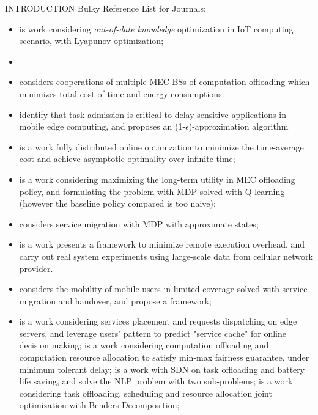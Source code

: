 \documentclass[10pt, conference, letterpaper]{IEEEtran}
\begin{document}
\begin{section}{INTRODUCTION}
        Bulky Reference List for Journals:
        \begin{itemize}
            \item {} \cite{Lyu2017} is work considering \emph{out-of-date knowledge} optimization in IoT computing scenario, with Lyapunov optimization;
            \item {} \cite{Lyu2018b} 
            \item {} \cite{Fan2017} considers cooperations of multiple MEC-BSs of computation offloading which minimizes total cost of time and energy consumptions.
            \item {} \cite{Lyu2018} identify that task admission is critical to delay-sensitive applications in mobile edge computing, and proposes an (1-$\epsilon$)-approximation algorithm
            \item {} \cite{Lyu2018a} is a work fully distributed online optimization to minimize the time-average cost and achieve asymptotic optimality over infinite time;
            \item {} \cite{Zheng2019} is a work considering maximizing the long-term utility in MEC offloading policy, and formulating the problem with MDP solved with Q-learning (however the baseline policy compared is too naive);
            \item {} \cite{Wang2015} considers service migration with MDP with approximate states;
            
            \item {} \cite{Yu2018} is a work presents a framework to minimize remote execution overhead, and carry out real system experiments using large-scale data from cellular network provider.
            \item {} \cite{Wang2018} considers the mobility of mobile users in limited coverage solved with service migration and handover, and propose a framework;
            
            \item {}
                \cite{Yang2016} is a work considering services placement and requests dispatching on edge servers, and leverage users' pattern to predict "service cache" for online decision making;
                \cite{Du2018} is a work considering computation offloading and computation resource allocation to satisfy min-max fairness guarantee, under minimum tolerant delay;
                \cite{Chen2018} is a work with SDN on task offloading and battery life saving, and solve the NLP problem with two sub-problems;
                \cite{Alameddine2019} is a work considering task offloading, scheduling and resource allocation joint optimization with Benders Decomposition;


\end{itemize}
\end{section}
\end{document}
